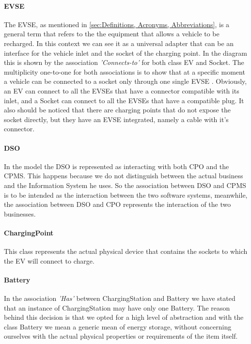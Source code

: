\paragraph{EVSE}
The EVSE, as mentioned in \ref{sec:Definitions, Acronyms, Abbreviations}, is a general term that refers to the the equipment that allows a vehicle to be recharged. In this context we can see it as a universal adapter that can be an interface for the vehicle inlet and the socket of the charging point. In the diagram this is shown by the association \textit{'Connects-to'} for both class EV and Socket. The multiplicity one-to-one for both associations is to show that at a specific moment a vehicle can be connected to a socket only through one single EVSE \cite{larmanUML}. Obviously, an EV can connect to all the EVSEs that have a connector compatible with its inlet, and a Socket can connect to all the EVSEs that have a compatible plug. It also should be noticed that there are charging points that do not expose the socket directly, but they have an EVSE integrated, namely a cable with it's connector.

\paragraph{DSO}
In the model the DSO is represented as interacting with both CPO and the CPMS. This happens because we do not distinguish between the actual business and the Information System he uses. So the association between DSO and CPMS is to be intended as the interaction between the two software systems, meanwhile, the association between DSO and CPO represents the interaction of the two businesses.

\paragraph{ChargingPoint}
This class represents the actual physical device that contains the sockets to which the EV will connect to charge.

\paragraph{Battery} In the association \textit{'Has'} between ChargingStation and Battery we have stated that an instance of ChargingStation may have only one Battery. The reason behind this decision is that we opted for a high level of abstraction and with the class Battery we mean a generic mean of energy storage, without concerning ourselves with the actual physical properties or requirements of the item itself.

